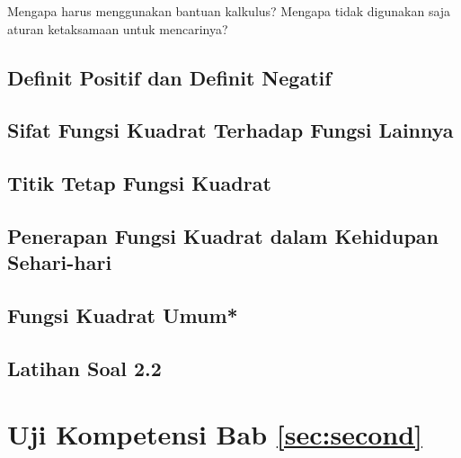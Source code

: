 	\begin{explbox}
		Mengapa harus menggunakan bantuan kalkulus? Mengapa tidak digunakan saja aturan ketaksamaan untuk mencarinya?
	\end{explbox}

\subsection{Definit Positif dan Definit Negatif}
	
	\kant[7-8]
	
\subsection{Sifat Fungsi Kuadrat Terhadap Fungsi Lainnya}
	
	\kant[9-10]
	
\subsection{Titik Tetap Fungsi Kuadrat}
	
	\kant[11-12]
	
\subsection{Penerapan Fungsi Kuadrat dalam Kehidupan Sehari-hari}
	
	\kant[13-14]
	
\subsection{Fungsi Kuadrat Umum*}
	
	\kant[15-16]
	
\subsection{Latihan Soal 2.2}
	
	\kant[17-18]

\newpage


\section{Uji Kompetensi Bab \ref{sec:second}}

\kant[6-10]